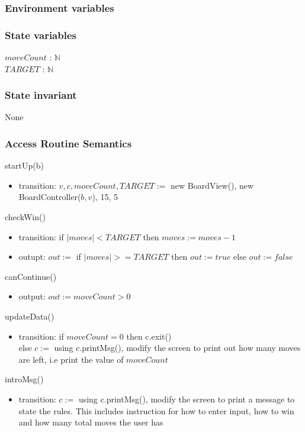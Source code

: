 \documentclass[12pt]{article}
\begin{document}
\subsubsection* {Environment variables}


\subsubsection* {State variables}
\noindent $moveCount$ : $\mathbb{N}$\\
\noindent $TARGET$ : $\mathbb{N}$\\


\subsubsection*{State invariant}
\noindent None

\subsubsection* {Access Routine Semantics}

\noindent startUp(b)
\begin{itemize}
\item transition: $v,c,moveCount,TARGET :=$  new BoardView(), new BoardController($b,v$), 15, 5 
\end{itemize}


\noindent checkWin()
\begin{itemize}
\item transition: if $|moves| < TARGET$ then $moves := moves - 1$
 \item outupt: $out :=$ if $|moves| >= TARGET$ then $out := true$ else $out := false$
\end{itemize}

\noindent canContinue()
\begin{itemize}
\item output: $out := moveCount > 0$
\end{itemize}


\noindent updateData()
\begin{itemize}
\item transition: if $moveCount = 0$ then c.exit() \\
else $c := $ using c.printMsg(), modify the screen to print out how many moves are left, i.e print the value of $moveCount$
\end{itemize}


\noindent introMsg()
\begin{itemize}
\item transition: $c :=$ using c.printMsg(), modify the screen to print a message to state the rules. This includes instruction for how to enter input, how to win and how many total moves the user has
\end{itemize}
\end{document}

